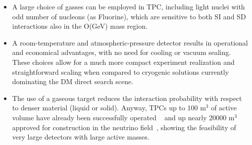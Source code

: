 \documentclass[physics,article,submit,moreauthors,pdftex]{Definitions/mdpi}
\newcommand{\keV}{\ensuremath{\,\textrm{keV}}\xspace}
\begin{document}
\begin{itemize}
\item  A large choice of gasses can be employed in TPC, including light nuclei with odd number of nucleons (as Fluorine),  which are sensitive to both SI and SD interactions also in the O(GeV) mass region.

\item A room-temperature and atmospheric-pressure detector results in operational and economical advantages, with no need for cooling or vacuum sealing. These choices allow for a much more compact experiment realization and straightforward scaling when compared to cryogenic solutions currently dominating the DM direct search scene.

\item The use of a gaseous target reduces the interaction probability with respect to denser material (liquid or solid). Anyway, TPCs up to 100 m$^{3}$ of active volume have already been successfully operated ~\cite{bib:alice, bib:tpc4} and up nearly 20000 m$^{3}$ approved for construction in the neutrino field~\cite{bib:dune}, showing the feasibility of very large detectors with large active masses.
\end{itemize}


\end{document}
